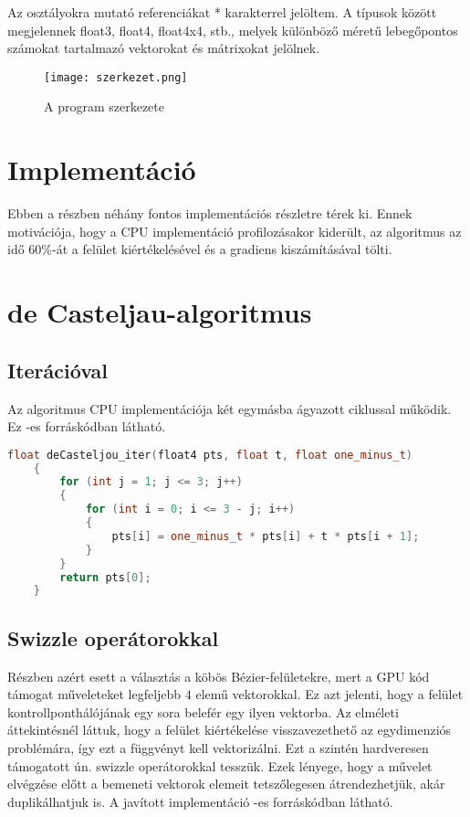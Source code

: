 Az osztályokra mutató referenciákat * karakterrel jelöltem. A típusok között megjelennek float3, float4, float4x4, stb., melyek különböző méretű lebegőpontos számokat tartalmazó vektorokat és mátrixokat jelölnek.

\begin{figure}
	\centering
	\texttt{[image: szerkezet.png]}
	\caption{A program szerkezete}
	\label{fig:szerkezet}
\end{figure}




\section{Implementáció}

Ebben a részben néhány fontos implementációs részletre térek ki. Ennek motivációja, hogy a CPU implementáció profilozásakor kiderült, az algoritmus az idő $60\%$-át a felület kiértékelésével és a gradiens kiszámításával tölti.

\section{de Casteljau-algoritmus}
\subsection{Iterációval}
Az algoritmus CPU implementációja két egymásba ágyazott ciklussal működik. Ez -es forráskódban látható.

\begin{lstlisting}[caption={de Casteljau iterációval}, language={C++}, label={lst:iter}]
	float deCasteljou_iter(float4 pts, float t, float one_minus_t)
	{
		for (int j = 1; j <= 3; j++)
		{
			for (int i = 0; i <= 3 - j; i++)
			{
				pts[i] = one_minus_t * pts[i] + t * pts[i + 1];
			}
		}
		return pts[0];
	}
\end{lstlisting}

\subsection{Swizzle operátorokkal}
Részben azért esett a választás a köbös Bézier-felületekre, mert a GPU kód támogat műveleteket legfeljebb $4$ elemű vektorokkal. Ez azt jelenti, hogy a felület kontrollponthálójának egy sora belefér egy ilyen vektorba. Az elméleti áttekintésnél láttuk, hogy a felület kiértékelése visszavezethető az egydimenziós problémára, így ezt a függvényt kell vektorizálni. Ezt a szintén hardveresen támogatott ún. swizzle operátorokkal tesszük. Ezek lényege, hogy a művelet elvégzése előtt a bemeneti vektorok elemeit tetszőlegesen átrendezhetjük, akár duplikálhatjuk is. A javított implementáció -es forráskódban látható.

